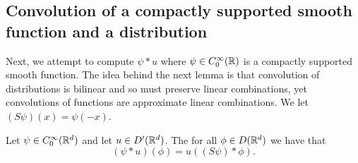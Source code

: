 \documentclass[twoside, a4paper, 10pt]{amsart}
\begin{document}
\subsection{Convolution of a compactly supported smooth function and a distribution}

Next, we attempt to compute $\psi * u$ where $\psi \in C_0^{\infty}(\mathbb{R})$ is a compactly supported smooth function. The idea behind the next lemma is that convolution of distributions is bilinear and so must preserve linear combinations, yet convolutions of functions are approximate linear combinations. We let $(S\psi)(x) = \psi(-x)$.

\begin{lemma} Let $\psi \in C_0^{\infty}(\mathbb{R}^d)$ and let $u \in D'(\mathbb{R}^d)$. The for all $\phi \in  D(\mathbb{R}^d)$ we have that $$(\psi * u)(\phi) = u((S\psi) * \phi).$$

\end{lemma}
\end{document}
